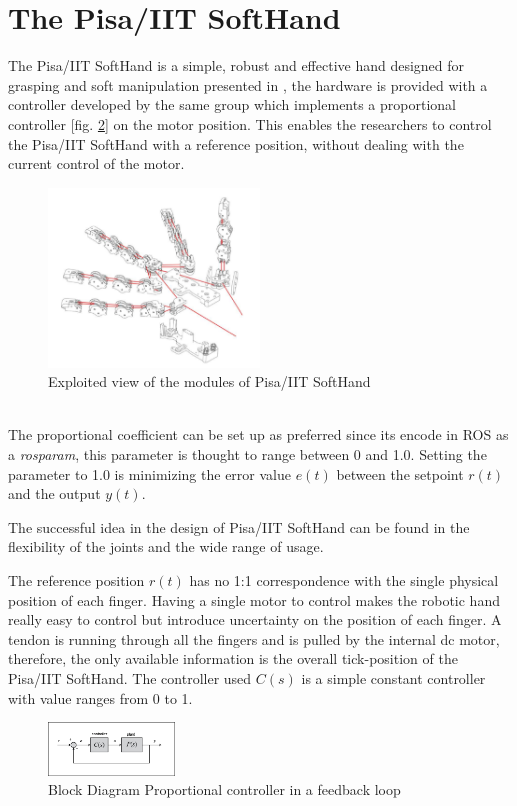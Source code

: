 \section{The Pisa/IIT SoftHand}
The Pisa/IIT SoftHand is a simple, robust and effective hand designed for grasping and soft manipulation presented in \cite{catalanopisa}, the hardware is provided with a controller developed by the same group which implements a proportional controller [fig. \ref{Fig:Pr}] on the motor position. This enables the researchers to control the Pisa/IIT SoftHand with a reference position, without dealing with the current control of the motor.\\
\begin{figure}[h]
\centering
\includegraphics[width=0.5\textwidth]{Figure/softhand.png}
\caption{Exploited view of the modules of Pisa/IIT SoftHand}
\label{Fig:Softhand}
\end{figure}\\
The proportional coefficient can be set up as preferred since its encode in ROS as a \textit{rosparam}, this parameter is thought to range between 0 and 1.0. Setting the parameter to 1.0 is minimizing the error value $e(t)$  between the setpoint $r(t)$ and the output $y(t)$.

The successful idea in the design of Pisa/IIT SoftHand can be found in the flexibility of the joints and the wide range of usage.

The reference position $r(t)$ has no 1:1 correspondence with the single physical position of each finger. Having a single motor to control makes the robotic hand really easy to control but introduce uncertainty on the position of each finger. A tendon is running through all the fingers and is pulled by the internal dc motor, therefore, the only available information is the overall tick-position of the Pisa/IIT SoftHand. The controller used $C(s)$ is a simple constant controller with value ranges from 0 to 1. 

\begin{figure}[h]
\centering
\includegraphics[width=0.3\textwidth]{Figure/feedbackP.png}
\caption{Block Diagram Proportional controller in a feedback loop}
\label{Fig:Pr}
\end{figure}


